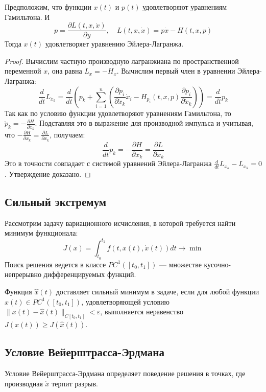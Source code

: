 \begin{proposition}
Предположим, что функции $x(t)$ и $p(t)$ удовлетворяют уравнениям Гамильтона. И
$$p = \frac{\partial L(t,x,\dot{x})}{\partial y}, \quad L(t, x, \dot{x}) = p\dot{x} - H(t, x, p)$$
Тогда $x(t)$ удовлетворяет уравнению Эйлера-Лагранжа.
\end{proposition}
\begin{proof}
Вычислим частную производную лагранжиана по пространственной переменной $x$, она равна $L_x = -H_x$.
Вычислим первый член в уравнении Эйлера-Лагранжа:
  $$\frac{d}{dt} L_{\dot{x}_k} = \frac{d}{dt} \left(p_k + \sum_{i=1}^n (\frac{\partial p_i}{\partial \dot{x}_k}\dot{x}_i - H_{p_i}(t, x, p)\frac{\partial p_i}{\partial \dot{x}_k}) \right) 
  = \frac{d}{dt} p_k
  $$
Так как по условию функции удовлетворяют уравнениям Гамильтона, то $\dot{p}_k = -\frac{\partial H}{\partial x_k}$.
Подставляя это в выражение для производной импульса и учитывая, что $-\frac{\partial H}{\partial x_k} = \frac{\partial L}{\partial x_k}$, получаем:
$$ \frac{d}{dt} p_k = -\frac{\partial H}{\partial x_k} = \frac{\partial L}{\partial x_k} $$
Это в точности совпадает с системой уравнений Эйлера-Лагранжа $\frac{d}{dt} L_{\dot{x}_k} - L_{x_k} = 0$. Утверждение доказано.
\end{proof}

\subsection{Сильный экстремум}

Рассмотрим задачу вариационного исчисления, в которой требуется найти минимум функционала:
\begin{equation}
J(x) = \int_{t_0}^{t_1} f(t, x(t), \dot{x}(t)) dt \to \min 
\end{equation}
Поиск решения ведется в классе $PC^1([t_0, t_1])$ --- множестве кусочно-непрерывно дифференцируемых функций.

\begin{definition}
Функция $\hat{x}(t)$ доставляет сильный минимум в задаче, если для любой функции $x(t) \in PC^1([t_0, t_1])$, 
удовлетворяющей условию $\|x(t) - \hat{x}(t)\|_{C[t_0, t_1]} < \varepsilon$, выполняется неравенство $J(x(t)) \ge J(\hat{x}(t))$.
\end{definition}

\subsection{Условие Вейерштрасса-Эрдмана}
Условие Вейерштрасса-Эрдмана определяет поведение решения в точках, где производная $\dot{x}$ терпит разрыв.

